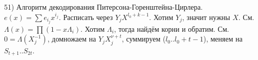 51) Алгоритм декодирования Питерсона-Горенштейна-Цирлера.\\
$e(x)=\sum e_{i_j}x^{i_j}$.
Расписать через $Y_jX^{l_0+k-1}$. Хотим $Y_j$, значит нужны $X$.
См. $\Lambda(x)=\prod(1-x\Lambda_i)$. Хотим $\Lambda_i$, тогда найдём корни и обратим. См. $0=\Lambda(X_j^{-1})$, домножаем на $Y_jX_j^{\nu+t}$, суммируем ($l_0..l_0+t-1$), меняем на $S_{t+1}..S_{2t}$.
\\ 
